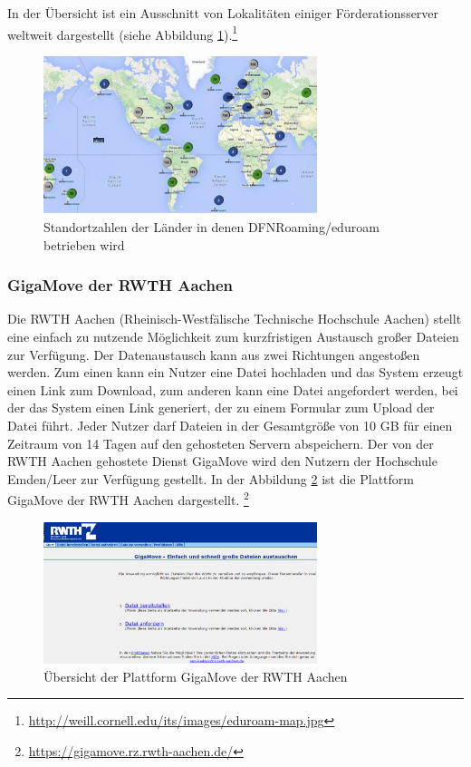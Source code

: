 In der Übersicht ist ein Ausschnitt von Lokalitäten einiger Förderationsserver weltweit dargestellt (siehe Abbildung \ref{fig_map_eduroam}).\footnote{\url{http://weill.cornell.edu/its/images/eduroam-map.jpg}}

\begin{figure}[h!]
	\centering
	\includegraphics[width=8cm]{kapitel/gruppe2/bilder/eduroam_map}
	\caption{Standortzahlen der Länder in denen DFNRoaming/eduroam betrieben wird}
	\label{fig_map_eduroam}
\end{figure}

\subsubsection{GigaMove der RWTH Aachen}
Die RWTH Aachen (Rheinisch-Westfälische Technische Hochschule Aachen) stellt eine einfach zu nutzende Möglichkeit zum kurzfristigen Austausch großer Dateien zur Verfügung. Der Datenaustausch kann aus zwei Richtungen angestoßen werden. Zum einen kann ein Nutzer eine Datei hochladen und das System erzeugt einen Link zum Download, zum anderen kann eine Datei angefordert werden, bei der das System einen Link generiert, der zu einem Formular zum Upload der Datei führt. Jeder Nutzer darf Dateien in der Gesamtgröße von 10 GB für einen Zeitraum von 14 Tagen auf den gehosteten Servern abspeichern. Der von der RWTH Aachen gehostete Dienst GigaMove wird den Nutzern der Hochschule Emden/Leer zur Verfügung gestellt. In der Abbildung \ref{fig_rwth_gigamove} ist die Plattform GigaMove der RWTH Aachen dargestellt. \footnote{\url{https://gigamove.rz.rwth-aachen.de/}} 

\begin{figure}
	\centering
	\includegraphics[width=8cm]{kapitel/gruppe2/bilder/rwth_gigamove}
	\caption{Übersicht der Plattform GigaMove der RWTH Aachen}
	\label{fig_rwth_gigamove}
\end{figure}

